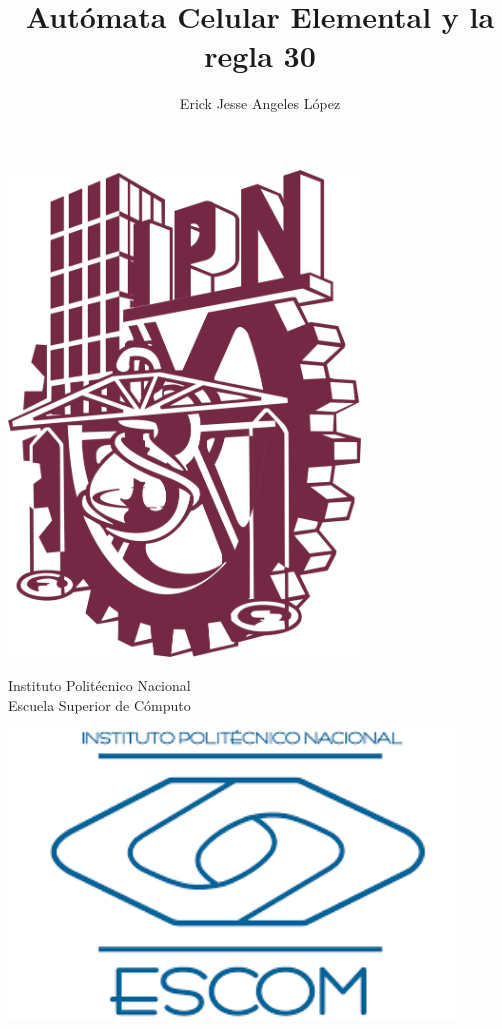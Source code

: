 \documentclass[12pt,twoside]{article}
\title{Autómata Celular Elemental y la regla 30}
\author{Erick Jesse Angeles López}
\date{}
\begin{document}
	
	\begin{center}
		
		\begin{minipage}{0.17\textwidth}
			\centering
			\includegraphics[width=0.7\textwidth]{img/ipn_logo.jpg} %
		\end{minipage}
		\begin{minipage}{.55\textwidth}
			\centering
			{\Large Instituto Politécnico Nacional}\\
			{\Large Escuela Superior de Cómputo}
		\end{minipage}
		\begin{minipage}{0.17\textwidth}
			\centering
			\includegraphics[width=0.9\textwidth]{img/escom_logo} %
		\end{minipage}			
	\end{center}
	
\end{document}
